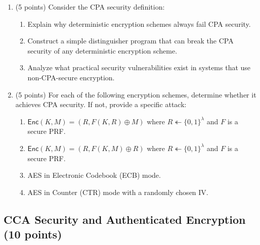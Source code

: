 \documentclass[10pt,a4paper,american]{exam}
\begin{document}
\begin{enumerate}
	\item (5 points) Consider the CPA security definition:
	      \begin{center}
	      \end{center}
	      \begin{enumerate}
		      \item Explain why deterministic encryption schemes always fail CPA security.
		      \item Construct a simple distinguisher program that can break the CPA security of any deterministic encryption scheme.
		      \item Analyze what practical security vulnerabilities exist in systems that use non-CPA-secure encryption.
	      \end{enumerate}

	\item (5 points) For each of the following encryption schemes, determine whether it achieves CPA security. If not, provide a specific attack:
	      \begin{enumerate}
		      \item $\textsf{Enc}(K, M) = (R, F(K, R) \oplus M)$ where $R \twoheadleftarrow \{0,1\}^{\lambda}$ and $F$ is a secure PRF.
		      \item $\textsf{Enc}(K, M) = (R, F(K, M) \oplus R)$ where $R \twoheadleftarrow \{0,1\}^{\lambda}$ and $F$ is a secure PRF.
		      \item AES in Electronic Codebook (ECB) mode.
		      \item AES in Counter (CTR) mode with a randomly chosen IV.
	      \end{enumerate}
\end{enumerate}

\subsection{CCA Security and Authenticated Encryption (10 points)}
\end{document}
